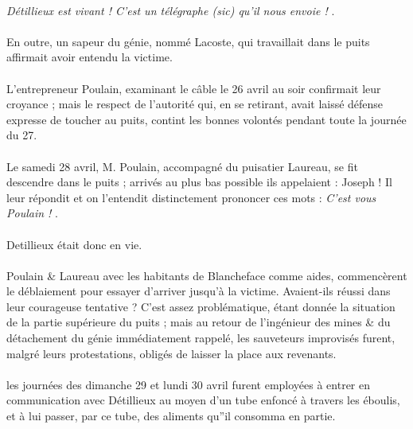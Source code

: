 \documentclass[../eBook.tex]{subfiles}
\begin{document}
      \paragraph{}\og \textit{Détillieux est vivant ! C'est un télégraphe (sic) qu'il nous envoie !} \fg{}.
      \paragraph{}En outre, un sapeur du génie, nommé  Lacoste, qui travaillait dans le puits affirmait avoir entendu la victime.
      \paragraph{}L'entrepreneur Poulain, examinant le câble le 26 avril au soir confirmait leur croyance ; mais le respect de l'autorité qui, en se retirant, avait laissé défense expresse de toucher au puits, contint les bonnes volontés pendant toute la journée du 27.
      \paragraph{}Le samedi 28 avril, M. Poulain, accompagné du puisatier Laureau, se fit descendre dans le puits ; arrivés au plus bas possible ils appelaient : Joseph ! Il leur répondit et on l'entendit distinctement prononcer ces mots :  \og \textit{C'est vous Poulain !} \fg{}.
      \paragraph{}Detillieux était donc en vie.
      \paragraph{}Poulain \& Laureau avec les habitants de Blancheface comme aides, commencèrent le déblaiement pour essayer d'arriver jusqu'à la victime. Avaient-ils réussi dans leur courageuse tentative ? C'est assez problématique, étant donnée la situation de la partie supérieure du puits ; mais au retour de l'ingénieur des mines \& du détachement du génie immédiatement rappelé, les sauveteurs improvisés furent, malgré leurs protestations, obligés de laisser la place aux revenants.
      \paragraph{}les journées des dimanche 29 et lundi 30 avril furent employées à entrer en communication avec Détillieux au moyen d'un tube enfoncé à travers les éboulis, et à lui passer, par ce tube, des aliments qu''il consomma en partie.
\end{document}
